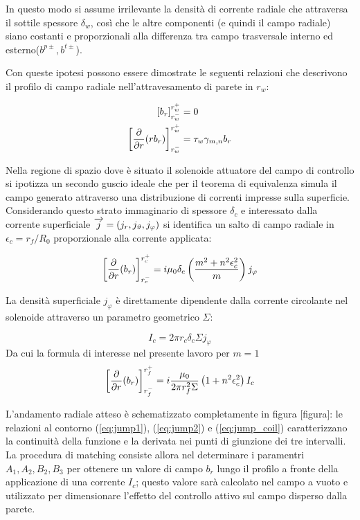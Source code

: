 In questo modo si assume irrilevante la densità di corrente radiale che
attraversa il sottile spessore $\delta_w$, così che le altre componenti
(e quindi il campo radiale) siano costanti e proporzionali alla
differenza tra campo trasversale interno ed esterno($b^{p\pm},b^{t\pm}$).

Con queste ipotesi possono essere dimostrate \cite{pizz70} le seguenti
relazioni che descrivono il profilo di campo radiale nell'attravesamento
di parete in $r_w$:

\begin{align}
 \label{eq:jump1}
 \left[ b_r \right]_{r_w^-}^{r_w^+} &= 0  \\
 \label{eq:jump2}
 \left[  \frac{\partial }{\partial r}(rb_r)  \right]_{r_w^-}^{r_w^+} &= \tau_w \gamma_{m,n}b_r
\end{align}

Nella regione di spazio dove è situato il solenoide attuatore del campo
di controllo si ipotizza un secondo guscio ideale che per il teorema di
equivalenza simula il campo generato attraverso una distribuzione di
correnti impresse sulla superficie. Considerando questo strato
immaginario di spessore $\delta_c$ e interessato dalla corrente
superficiale $\overrightarrow{j} = (j_r,j_\vartheta,j_\varphi)$ si identifica un
salto di campo radiale in $\epsilon_c = r_f/R_0$ proporzionale alla corrente
applicata:

\begin{equation}
 \left[  \frac{\partial }{\partial r}(b_r)  \right]_{r_c^-}^{r_c^+} = i \mu_0 \delta_c
  \left( \frac{m^2 + n^2 \epsilon_c^2}{m} \right) j_\varphi
\end{equation}

La densità superficiale $j_\varphi$ è direttamente dipendente dalla
corrente circolante nel solenoide attraverso un parametro geometrico
$\Sigma$:

\begin{equation}
 I_c = 2 \pi r_c \delta_c \Sigma j_\varphi
\end{equation}
Da cui la formula di interesse nel presente lavoro per $m=1$
\begin{equation}
 \label{eq:jump_coil}
 \left[  \frac{\partial }{\partial r}(b_r)  \right]_{r_f^-}^{r_f^+} = i \frac{\mu_0}{2\pi r_f^2 \Sigma}
  \left( {1 + n^2 \epsilon_c^2} \right) I_c
\end{equation}

L'andamento radiale atteso è schematizzato completamente in figura
[figura]: le relazioni al contorno (\ref{eq:jump1}), (\ref{eq:jump2}) e
(\ref{eq:jump_coil}) caratterizzano la continuità della funzione e la
derivata nei punti di giunzione dei tre intervalli. La procedura di
matching consiste allora nel determinare i paramentri $A_1,A_2,B_2,B_3$ per
ottenere un valore di campo $b_r$ lungo il profilo a fronte della
applicazione di una corrente $I_c$; questo valore sarà calcolato nel
campo a vuoto e utilizzato per dimensionare l'effetto del controllo
attivo sul campo disperso dalla parete.

